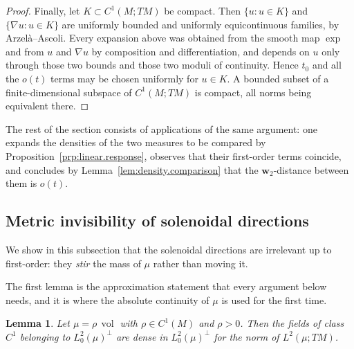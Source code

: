 \documentclass[11pt,reqno]{amsart}
\theoremstyle{plain}
\newtheorem{lem}[thm]{Lemma}
\theoremstyle{definition}
\newcommand{\dw}{\mathbf{w}_2}
\DeclareMathOperator{\vol}{vol}
\begin{document}
\begin{proof}
    Finally, let \( K\subset C^1(M;TM) \) be compact.
    Then \( \{u:u\in K\} \) and \( \{\nabla u:u\in K\} \) are uniformly bounded and uniformly equicontinuous families, by Arzelà--Ascoli.
    Every expansion above was obtained from the smooth map \( \exp \) and from \( u \) and \( \nabla u \) by composition and differentiation, and depends on \( u \) only through those two bounds and those two moduli of continuity.
    Hence \( t_0 \) and all the \( o(t) \) terms may be chosen uniformly for \( u\in K \).
    A bounded subset of a finite-dimensional subspace of \( C^1(M;TM) \) is compact, all norms being equivalent there.
\end{proof}
    
The rest of the section consists of applications of the same argument: one expands the densities of the two measures to be compared by Proposition~\ref{prp:linear.response}, observes that their first-order terms coincide, and concludes by Lemma~\ref{lem:density.comparison} that the \( \dw \)-distance between them is \( o(t) \).

\subsection{Metric invisibility of solenoidal directions}
\label{sec:solenoidal}
We show in this subsection that the solenoidal directions are irrelevant up to first-order: they \emph{stir} the mass of \( \mu \) rather than moving it.

The first lemma is the approximation statement that every argument below needs, and it is where the absolute continuity of \( \mu \) is used for the first time.

\begin{lem}
\label{lem:regular.solenoidal}
    Let \( \mu=\rho\,\vol \) with \( \rho\in C^1(M) \) and \( \rho>0 \).
    Then the fields of class \( C^1 \) belonging to \( L^2_0(\mu)^\perp \) are dense in \( L^2_0(\mu)^\perp \) for the norm of \( L^2(\mu;TM) \).
\end{lem}
\end{document}
